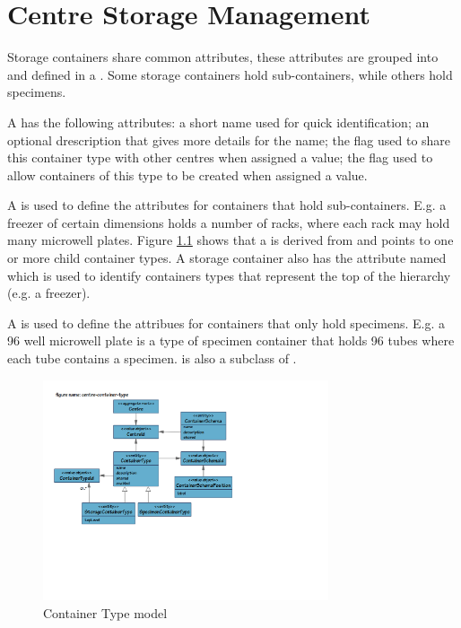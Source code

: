 \chapter{Centre Storage Management}
\label{chap:centre-storage-management}
Storage containers share common attributes, these attributes are grouped into
and defined in a . Some storage containers hold
sub-containers, while others hold specimens.

A  has the following attributes: a short name used
for quick identification; an optional drescription that gives more details for
the name; the  flag used to share this container type with
other centres when assigned a  value; the 
flag used to allow containers of this type to be created when assigned a
 value.

A  is used to define the attributes for
containers that hold sub-containers. E.g. a freezer of certain dimensions holds
a number of racks, where each rack may hold many microwell plates. Figure
\ref{fig:centre-container-type} shows that a 
is derived from  and points to one or more child
container types. A storage container also has the attribute named
 which is used to identify containers types that represent
the top of the hierarchy (e.g. a freezer).

A  is used to define the attribues for
containers that only hold specimens. E.g. a 96 well microwell plate is a type
of specimen container that holds 96 tubes where each tube contains a specimen.
 is also a subclass of
.

\begin{figure}[H]
  \centering
  \includegraphics[trim={10mm 73mm 92mm 18mm}, clip,
    width=0.75\textwidth]{images/centre-container-type}
  \caption{Container Type model}
  \label{fig:centre-container-type}
\end{figure}

